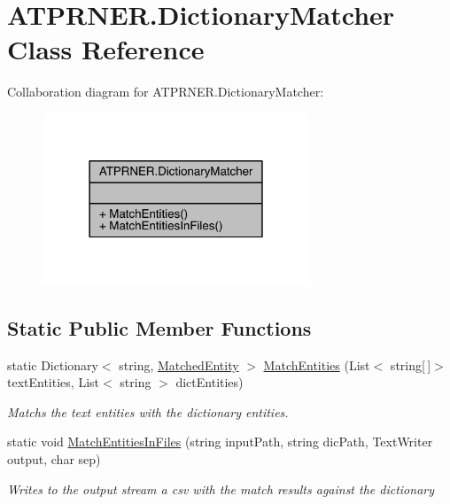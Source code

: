\hypertarget{class_a_t_p_r_n_e_r_1_1_dictionary_matcher}{}\section{A\+T\+P\+R\+N\+E\+R.\+Dictionary\+Matcher Class Reference}
\label{class_a_t_p_r_n_e_r_1_1_dictionary_matcher}


Collaboration diagram for A\+T\+P\+R\+N\+E\+R.\+Dictionary\+Matcher\+:
\nopagebreak
\begin{figure}[H]
\begin{center}
\leavevmode
\includegraphics[width=226pt]{db/d42/class_a_t_p_r_n_e_r_1_1_dictionary_matcher__coll__graph}
\end{center}
\end{figure}
\subsection*{Static Public Member Functions}
\begin{DoxyCompactItemize}
\item 
static Dictionary$<$ string, \hyperlink{class_a_t_p_r_n_e_r_1_1_matched_entity}{Matched\+Entity} $>$ \hyperlink{class_a_t_p_r_n_e_r_1_1_dictionary_matcher_aa6fdeaf3a88c14b5ed8e4f452d1c3c17}{Match\+Entities} (List$<$ string\mbox{[}$\,$\mbox{]}$>$ text\+Entities, List$<$ string $>$ dict\+Entities)
\begin{DoxyCompactList}\small\item\em Matchs the text entities with the dictionary entities. \end{DoxyCompactList}\item 
static void \hyperlink{class_a_t_p_r_n_e_r_1_1_dictionary_matcher_a6fc36cbd0e0df420c2aaafa389ae7b61}{Match\+Entities\+In\+Files} (string input\+Path, string dic\+Path, Text\+Writer output, char sep)
\begin{DoxyCompactList}\small\item\em Writes to the output stream a csv with the match results against the dictionary \end{DoxyCompactList}\end{DoxyCompactItemize}


